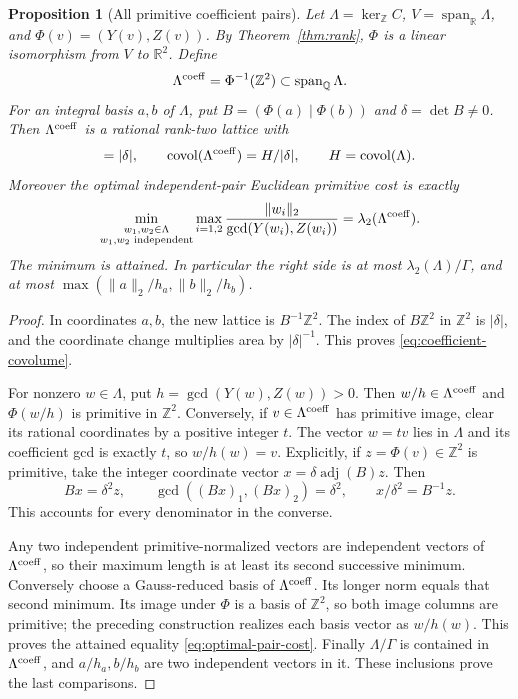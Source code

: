 \documentclass[11pt]{article}
\newtheorem{proposition}[theorem]{Proposition}
\theoremstyle{remark}
\newcommand{\Z}{\mathbb Z}
\newcommand{\R}{\mathbb R}
\newcommand{\Q}{\mathbb Q}
\DeclareMathOperator{\covol}{covol}
\begin{document}
\begin{proposition}[All primitive coefficient pairs]
\label{prop:coefficient-lattice}
Let \(\Lambda=\ker_\Z C\), \(V=\operatorname{span}_\R\Lambda\),
and \(\Phi(v)=(Y(v),Z(v))\). By Theorem~\ref{thm:rank}, \(\Phi\)
is a linear isomorphism from \(V\) to \(\R^2\). Define
\[
 \Lambda^{\rm coeff}=\Phi^{-1}(\Z^2)
       \subset\operatorname{span}_\Q\Lambda.
\]
For an integral basis \(a,b\) of \(\Lambda\), put
\(B=(\Phi(a)\mid\Phi(b))\) and \(\delta=\det B\ne0\).
Then \(\Lambda^{\rm coeff}\) is a rational rank-two lattice with
\begin{equation}
 [\Lambda^{\rm coeff}:\Lambda]=|\delta|,\qquad
 \covol(\Lambda^{\rm coeff})=H/|\delta|,
 \qquad H=\covol(\Lambda).
 \label{eq:coefficient-covolume}
\end{equation}
Moreover the optimal independent-pair Euclidean primitive cost is exactly
\begin{equation}
 \min_{\substack{w_1,w_2\in\Lambda\\w_1,w_2\text{ independent}}}
       \max_{i=1,2}\frac{\|w_i\|_2}{\gcd(Y(w_i),Z(w_i))}
       =\lambda_2(\Lambda^{\rm coeff}).
 \label{eq:optimal-pair-cost}
\end{equation}
The minimum is attained. In particular the right side is at most
\(\lambda_2(\Lambda)/\Gamma\), and at most
\(\max(\|a\|_2/h_a,\|b\|_2/h_b)\).
\end{proposition}
\begin{proof}
In coordinates \(a,b\), the new lattice is \(B^{-1}\Z^2\).
The index of \(B\Z^2\) in \(\Z^2\) is \(|\delta|\), and the
coordinate change multiplies area by \(|\delta|^{-1}\).
This proves \eqref{eq:coefficient-covolume}.

For nonzero \(w\in\Lambda\), put \(h=\gcd(Y(w),Z(w))>0\).
Then \(w/h\in\Lambda^{\rm coeff}\) and \(\Phi(w/h)\) is primitive
in \(\Z^2\). Conversely, if \(v\in\Lambda^{\rm coeff}\) has
primitive image, clear its rational coordinates by a positive integer
\(t\). The vector \(w=tv\) lies in \(\Lambda\) and its coefficient
gcd is exactly \(t\), so \(w/h(w)=v\).
Explicitly, if \(z=\Phi(v)\in\Z^2\) is primitive, take the integer
coordinate vector \(x=\delta\operatorname{adj}(B)z\). Then
\[
 Bx=\delta^2z,\qquad \gcd((Bx)_1,(Bx)_2)=\delta^2,\qquad
 x/\delta^2=B^{-1}z.
\]
This accounts for every denominator in the converse.

Any two independent primitive-normalized vectors are independent vectors
of \(\Lambda^{\rm coeff}\), so their maximum length is at least its
second successive minimum. Conversely choose a Gauss-reduced basis of
\(\Lambda^{\rm coeff}\). Its longer norm equals that second minimum.
Its image under \(\Phi\) is a basis of \(\Z^2\), so both image
columns are primitive; the preceding construction realizes each basis
vector as \(w/h(w)\). This proves the attained equality
\eqref{eq:optimal-pair-cost}. Finally \(\Lambda/\Gamma\) is contained
in \(\Lambda^{\rm coeff}\), and \(a/h_a,b/h_b\) are two independent
vectors in it. These inclusions prove the last comparisons.
\end{proof}
\end{document}
